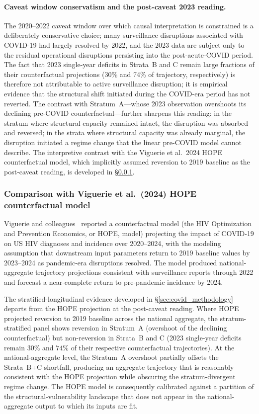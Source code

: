 \documentclass[11pt]{article}
\begin{document}
\paragraph{Caveat window conservatism and the post-caveat 2023 reading.} The 2020--2022 caveat window over which causal interpretation is constrained is a deliberately conservative choice; many surveillance disruptions associated with COVID-19 had largely resolved by 2022, and the 2023 data are subject only to the residual operational disruptions persisting into the post-acute-COVID period. The fact that 2023 single-year deficits in Strata~B and C remain large fractions of their counterfactual projections (30\% and 74\% of trajectory, respectively) is therefore not attributable to active surveillance disruption; it is empirical evidence that the structural shift initiated during the COVID-era period has not reverted. The contrast with Stratum~A---whose 2023 observation overshoots its declining pre-COVID counterfactual---further sharpens this reading: in the stratum where structural capacity remained intact, the disruption was absorbed and reversed; in the strata where structural capacity was already marginal, the disruption initiated a regime change that the linear pre-COVID model cannot describe. The interpretive contrast with the Viguerie et al.\ 2024 HOPE counterfactual model, which implicitly assumed reversion to 2019 baseline as the post-caveat reading, is developed in §\ref{sec:viguerie}.

\subsubsection{Comparison with Viguerie et al.\ (2024) HOPE counterfactual model}\label{sec:viguerie}

Viguerie and colleagues~\cite{viguerie2024} reported a counterfactual model (the HIV Optimization and Prevention Economics, or HOPE, model) projecting the impact of COVID-19 on US HIV diagnoses and incidence over 2020--2024, with the modeling assumption that downstream input parameters return to 2019 baseline values by 2023--2024 as pandemic-era disruptions resolved. The model produced national-aggregate trajectory projections consistent with surveillance reports through 2022 and forecast a near-complete return to pre-pandemic incidence by 2024.

The stratified-longitudinal evidence developed in §\ref{sec:covid_methodology} departs from the HOPE projection at the post-caveat reading. Where HOPE projected reversion to 2019 baseline across the national aggregate, the stratum-stratified panel shows reversion in Stratum~A (overshoot of the declining counterfactual) but non-reversion in Strata~B and C (2023 single-year deficits remain $30\%$ and $74\%$ of their respective counterfactual trajectories). At the national-aggregate level, the Stratum~A overshoot partially offsets the Strata~B+C shortfall, producing an aggregate trajectory that is reasonably consistent with the HOPE projection while obscuring the stratum-divergent regime change. The HOPE model is consequently calibrated against a partition of the structural-vulnerability landscape that does not appear in the national-aggregate output to which its inputs are fit.
\end{document}
